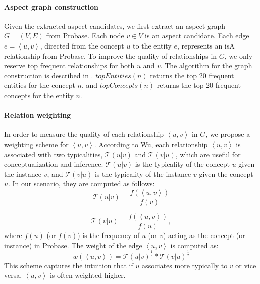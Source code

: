 \paragraph{Aspect graph construction}
Given the extracted aspect candidates,
we first extract an aspect graph $G=(V, E)$ from Probase.
Each node $v\in V$ is an aspect candidate.
Each edge $e=\left\langle u,v\right\rangle$,
directed from the concept $u$ to the entity $e$,
represents an isA relationship from Probase.
To improve the quality of relationships in $G$,
we only reserve top frequent relationships
for both $u$ and $v$. The algorithm for the graph
construction is described in .
 $topEntities(n)$ returns the top 20 frequent entities
 for the concept $n$, and $topConcepts(n)$ returns
 the top 20 frequent concepts for the entity $n$.

\paragraph{Relation weighting}
In order to measure the quality of each relationship 
$\left\langle u,v \right\rangle$ in $G$,
we propose a weighting scheme for 
$\left\langle u,v \right\rangle$.
According to Wu\cite{wu2012probase}, 
each relationship $\left\langle u,v \right\rangle$ 
is associated with 
two typicalities, $\mathcal{T}(u|v)$ and $\mathcal{T}(v|u)$,
which are useful for 
conceptualization and inference.
$\mathcal{T}(u|v)$ is the typicality of the concept $u$
given the instance $v$, and
$\mathcal{T}(v|u)$ is the typicality of the instance $v$ given 
the concept $u$.
In our scenario, they are computed as follows:
\begin{equation}
	\mathcal{T}(u|v) = \frac{f(\left\langle u,v \right\rangle)}{f(v)}
\end{equation}

\begin{equation}
\mathcal{T}(v|u) = \frac{f(\left\langle u,v \right\rangle)}{f(u)},
\end{equation}
where $f(u)$ (or $f(v)$) is the frequency of $u$ (or $v$)
acting as the concept (or instance) in Probase.
The weight of the edge $\left\langle u,v \right\rangle$
is computed as:
\begin{equation}
	w(\left\langle u,v \right\rangle) = \mathcal{T}(u|v)^{\frac{1}{2}} *\mathcal{T}(v|u)^{\frac{1}{2}}
	\label{eq:weighing}
\end{equation}
This scheme captures the intuition
that if $u$ associates more typically to $v$ or vice versa,
$\left\langle u,v \right\rangle$ is often weighted higher. 
